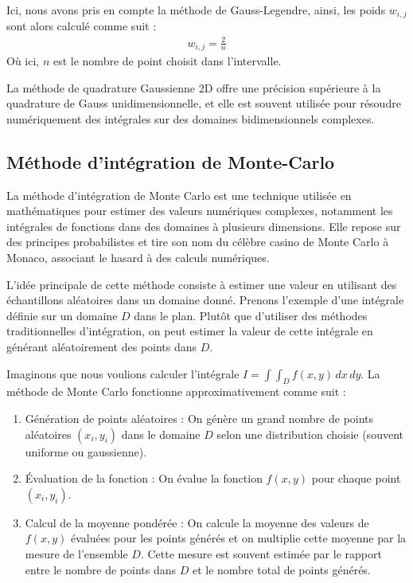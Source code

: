 \documentclass[10pt,a4paper]{article}
\begin{document}
Ici, nous avons pris en compte la méthode de Gauss-Legendre, ainsi, les poids $w_{i,j}$ sont alors calculé comme suit : 
\begin{align*}
  w_{i,j} =\frac{2}{n}
\end{align*}
Où ici, $n$ est le nombre de point choisit dans l'intervalle.

La méthode de quadrature Gaussienne 2D offre une précision supérieure à la quadrature de Gauss unidimensionnelle, et elle est souvent utilisée pour résoudre numériquement des intégrales sur des domaines bidimensionnels complexes.


\subsection{Méthode d'intégration de Monte-Carlo}

La méthode d'intégration de Monte Carlo est une technique utilisée en mathématiques pour estimer des valeurs numériques complexes, notamment les intégrales de fonctions dans des domaines à plusieurs dimensions. Elle repose sur des principes probabilistes et tire son nom du célèbre casino de Monte Carlo à Monaco, associant le hasard à des calculs numériques.

L'idée principale de cette méthode consiste à estimer une valeur en utilisant des échantillons aléatoires dans un domaine donné. Prenons l'exemple d'une intégrale définie sur un domaine $D$ dans le plan. Plutôt que d'utiliser des méthodes traditionnelles d'intégration, on peut estimer la valeur de cette intégrale en générant aléatoirement des points dans $D$.

Imaginons que nous voulions calculer l'intégrale $I = \int\int_{D} f(x,y) \, dx \, dy$. La méthode de Monte Carlo fonctionne approximativement comme suit :

\begin{enumerate}
    \item Génération de points aléatoires : On génère un grand nombre de points aléatoires $(x_i, y_i)$ dans le domaine $D$ selon une distribution choisie (souvent uniforme ou gaussienne).
    \item Évaluation de la fonction : On évalue la fonction $f(x,y)$ pour chaque point $(x_i, y_i)$.
    \item Calcul de la moyenne pondérée : On calcule la moyenne des valeurs de $f(x,y)$ évaluées pour les points générés et on multiplie cette moyenne par la mesure de l'ensemble $D$. Cette mesure est souvent estimée par le rapport entre le nombre de points dans $D$ et le nombre total de points générés.
\end{enumerate}
\end{document}
